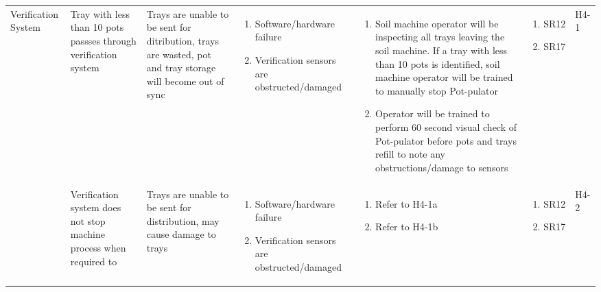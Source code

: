 \documentclass{article}
\begin{document}
\begin{landscape}
\begin{center}
\begin{longtable}{|l|  p{3cm}  p{4cm}  p{3cm}  p{4cm}  p{2cm}  p{1cm}|}
        Verification System&
        Tray with less than 10 pots passses through verification system&
        Trays are unable to be sent for ditribution, trays are wasted, pot and tray storage will become out of sync&
        \begin{enumerate}[label=(\alph*)]
            \item Software/hardware failure
            \item Verification sensors are obstructed/damaged
        \end{enumerate}&
        \begin{enumerate}[label=(\alph*)]
            \item Soil machine operator will be inspecting all trays leaving the soil machine. If a tray with less than 10 pots is identified, soil machine operator will be trained to manually stop Pot-pulator
            \item Operator will be trained to perform 60 second visual check of Pot-pulator before pots and trays refill to note any obstructions/damage to sensors
        \end{enumerate}&
        \begin{enumerate}[label=(\alph*)]
            \item SR12
            \item SR17
        \end{enumerate}&
        H4-1\\

        &
        Verification system does not stop machine process when required to&
        Trays are unable to be sent for distribution, may cause damage to trays&
        \begin{enumerate}[label=(\alph*)]
            \item Software/hardware failure
            \item Verification sensors are obstructed/damaged
        \end{enumerate}&
        \begin{enumerate}[label=(\alph*)]
            \item Refer to H4-1a
            \item Refer to H4-1b
        \end{enumerate}&
        \begin{enumerate}[label=(\alph*)]
            \item SR12
            \item SR17
        \end{enumerate}&
        H4-2\\


\end{longtable}
\end{center}
\end{landscape}
\end{document}
